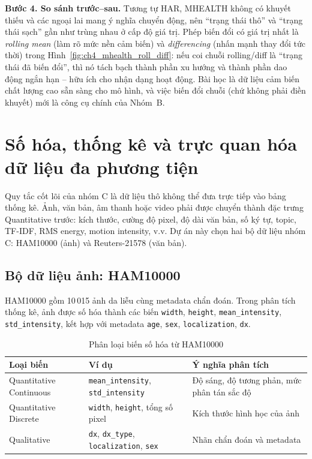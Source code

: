 \textbf{Bước 4. So sánh trước--sau.} Tương tự HAR, MHEALTH không có khuyết thiếu và các ngoại lai mang ý nghĩa chuyển động, nên ``trạng thái thô'' và ``trạng thái sạch'' gần như trùng nhau ở cấp độ giá trị. Phép biến đổi có giá trị nhất là \emph{rolling mean} (làm rõ mức nền cảm biến) và \emph{differencing} (nhấn mạnh thay đổi tức thời) trong Hình~\ref{fig:ch4_mhealth_roll_diff}: nếu coi chuỗi rolling/diff là ``trạng thái đã biến đổi'', thì nó tách bạch thành phần xu hướng và thành phần dao động ngắn hạn -- hữu ích cho nhận dạng hoạt động. Bài học là dữ liệu cảm biến chất lượng cao sẵn sàng cho mô hình, và việc biến đổi chuỗi (chứ không phải điền khuyết) mới là công cụ chính của Nhóm~B.

\chapterThreeExcelPythonComparison

\section{Số hóa, thống kê và trực quan hóa dữ liệu đa phương tiện}

Quy tắc cốt lõi của nhóm C là dữ liệu thô không thể đưa trực tiếp vào bảng thống kê. Ảnh, văn bản, âm thanh hoặc video phải được chuyển thành đặc trưng Quantitative trước: kích thước, cường độ pixel, độ dài văn bản, số ký tự, topic, TF-IDF, RMS energy, motion intensity, v.v. Dự án này chọn hai bộ dữ liệu nhóm C: HAM10000 (ảnh) và Reuters-21578 (văn bản).

\subsection{Bộ dữ liệu ảnh: HAM10000}

HAM10000 gồm 10\,015 ảnh da liễu cùng metadata chẩn đoán. Trong phân tích thống kê, ảnh được số hóa thành các biến \texttt{width}, \texttt{height}, \texttt{mean\_intensity}, \texttt{std\_intensity}, kết hợp với metadata \texttt{age}, \texttt{sex}, \texttt{localization}, \texttt{dx}.

\begin{table}[H]
\centering
\caption{Phân loại biến số hóa từ HAM10000}
\label{tab:ch4_ham_variable_types}
\small
\begin{tabularx}{\textwidth}{p{}p{}Y}
\toprule
Loại biến & Ví dụ & Ý nghĩa phân tích \\
\midrule
Quantitative Continuous & \texttt{mean\_intensity}, \texttt{std\_intensity} & Độ sáng, độ tương phản, mức phân tán sắc độ \\
Quantitative Discrete & \texttt{width}, \texttt{height}, tổng số pixel & Kích thước hình học của ảnh \\
Qualitative & \texttt{dx}, \texttt{dx\_type}, \texttt{localization}, \texttt{sex} & Nhãn chẩn đoán và metadata \\
\bottomrule
\end{tabularx}
\end{table}

